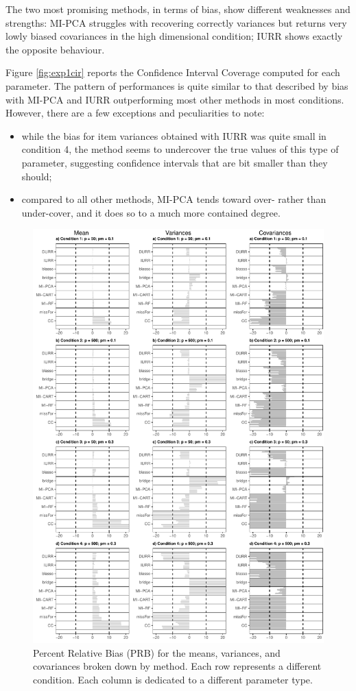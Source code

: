 	The two most promising methods, in terms of bias, show different weaknesses and strengths: 
	MI-PCA struggles with recovering correctly variances but returns very lowly 
	biased covariances in the high dimensional condition; IURR shows exactly the opposite behaviour.

	Figure \ref{fig:exp1cir} reports the Confidence Interval Coverage computed for each parameter.
	The pattern of performances is quite similar to that described by bias with MI-PCA and IURR 
	outperforming most other methods in most conditions. 
	However, there are a few exceptions and peculiarities to note: 
	\begin{itemize}
	\item while the bias for item variances obtained with IURR was quite small in condition 4, the method seems 
	to undercover the true values of this type of parameter, suggesting confidence intervals that are bit smaller
	than they should;
	\item compared to all other methods, MI-PCA tends toward over- rather than under-cover, and it 
	does so to a much more contained degree.
	\end{itemize}

\begin{figure}
	\includegraphics[width=\textwidth]{../../output/graphs/exp1_bias.pdf}
\caption{Percent Relative Bias (PRB) for the means, variances, and covariances broken 
	down by method. 
	Each row represents a different condition. 
	Each column is dedicated to a different parameter type.}
\label{fig:exp1bias}
\end{figure}


